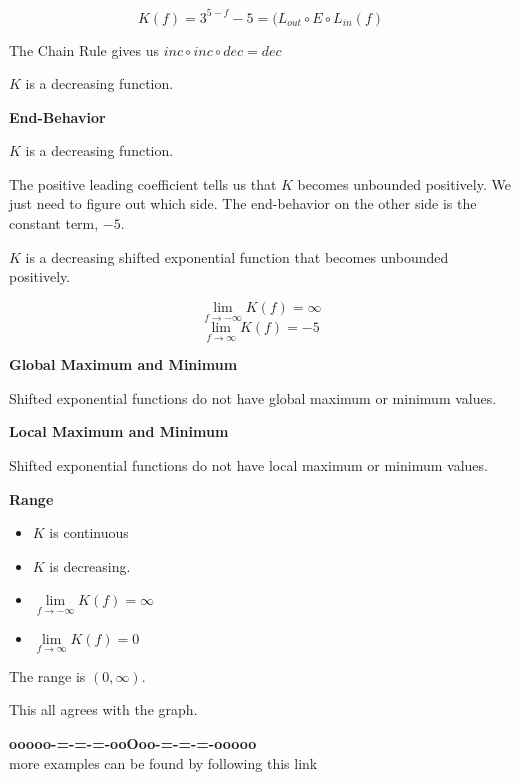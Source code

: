 \documentclass{ximera}
\begin{document}
\begin{example}
\[
K(f) = 3^{5 - f} - 5 = (L_{out} \circ E \circ L_{in}(f)
\]

The Chain Rule gives us $inc \circ inc \circ dec = dec$


$K$ is a decreasing function. 



\textbf{End-Behavior}


$K$ is a decreasing function. 

The positive leading coefficient tells us that $K$ becomes unbounded positively. We just need to figure out which side.  The end-behavior on the other side is the constant term, $-5$.


$K$ is a decreasing shifted exponential function that becomes unbounded positively. 


\[ \lim\limits_{f \to -\infty} K(f) = \infty \]
\[ \lim\limits_{f \to \infty} K(f) = -5 \]





\textbf{Global Maximum and Minimum}

Shifted exponential functions do not have global maximum or minimum values.





\textbf{Local Maximum and Minimum}

Shifted exponential functions do not have local maximum or minimum values.



\textbf{Range}

\begin{itemize}
\item $K$ is continuous
\item $K$ is decreasing.
\item $\lim\limits_{f \to -\infty} K(f) = \infty $
\item $\lim\limits_{f \to \infty} K(f) = 0$
\end{itemize}


The range is $(0, \infty)$. 







This all agrees with the graph. 




\end{example}
















\begin{center}
\textbf{\textcolor{green!50!black}{ooooo-=-=-=-ooOoo-=-=-=-ooooo}} \\

more examples can be found by following this link\\ 

\end{center}
\end{document}
